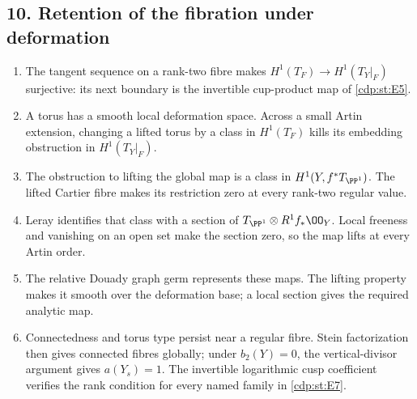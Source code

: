 \subsection*{10. Retention of the fibration under deformation}
\RungOne
\begin{enumerate}[label=\arabic*.,leftmargin=*]
\item The tangent sequence on a rank-two fibre makes
$H^1(T_F)\to H^1(T_Y|_F)$ surjective: its next boundary is
the invertible cup-product map of \ref{cdp:st:E5}.
\item A torus has a smooth local deformation space.  Across a
small Artin extension, changing a lifted torus by a class in
$H^1(T_F)$ kills its embedding obstruction in $H^1(T_Y|_F)$.
\item The obstruction to lifting the global map is a class in
$H^1(Y,f^*T_{\PP^1})$.  The lifted Cartier fibre makes its
restriction zero at every rank-two regular value.
\item Leray identifies that class with a section of
$T_{\PP^1}\otimes R^1f_*\OO_Y$.  Local freeness and vanishing
on an open set make the section zero, so the map lifts at every
Artin order.
\item The relative Douady graph germ represents these maps.
The lifting property makes it smooth over the deformation base;
a local section gives the required analytic map.
\item Connectedness and torus type persist near a regular fibre.
Stein factorization then gives connected fibres globally; under
$b_2(Y)=0$, the vertical-divisor argument gives $a(Y_s)=1$.
The invertible logarithmic cusp coefficient verifies the rank
condition for every named family in \ref{cdp:st:E7}.
\end{enumerate}

